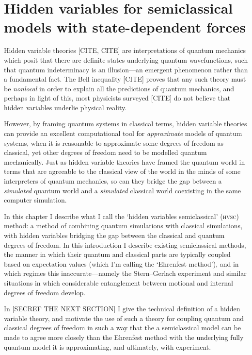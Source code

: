 
\chapter{Hidden variables for semiclassical models with state-dependent forces}

Hidden variable theories [CITE, CITE] are interpretations of quantum mechanics which posit that there are definite states underlying quantum wavefunctions, such that quantum indeterminacy is an illusion---an emergent phenomenon rather than a fundamental fact. The Bell inequality [CITE] proves that any such theory must be \emph{nonlocal} in order to explain all the predictions of quantum mechanics, and perhaps in light of this, most physicists surveyed [CITE] do not believe that hidden variables underlie physical reality.

However, by framing quantum systems in classical terms, hidden variable theories can provide an excellent computational tool for \emph{approximate} models of quantum systems, when it is reasonable to approximate some degrees of freedom as classical, yet other degrees of freedom need to be modelled quantum mechanically. Just as hidden variable theories have framed the quantum world in terms that are agreeable to the classical view of the world in the minds of some interpreters of quantum mechanics, so can they bridge the gap between a \emph{simulated} quantum world and a \emph{simulated} classical world coexisting in the same computer simulation.

In this chapter I describe what I call the `hidden variables semiclassical' (\textsc{hvsc}) method: a method of combining quantum simulations with classical simulations, with hidden variables bridging the gap between the classical and quantum degrees of freedom. In this introduction I describe existing semiclassical methods, the manner in which their quantum and classical parts are typically coupled based on expectation values (which I'm calling the `Ehrenfest method'), and in which regimes this inaccurate---namely the Stern--Gerlach experiment and similar situations in which considerable entanglement between motional and internal degrees of freedom develop.

In [SECREF THE NEXT SECTION] I give the technical definition of a hidden variable theory, and motivate the use of such a theory for coupling quantum and classical degrees of freedom in such a way that the a semiclassical model can be made to agree more closely than the Ehrenfest method with the underlying fully quantum model it is approximating, and ultimately, with experiment.

